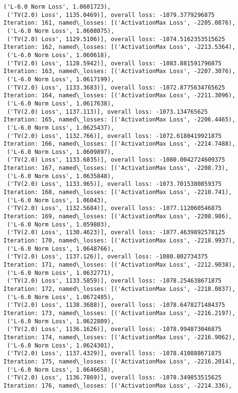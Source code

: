 \documentclass[10pt]{article}
\begin{document}
\begin{Verbatim}[commandchars=\\\{\}]
 ('L-6.0 Norm Loss', 1.0601723),
 ('TV(2.0) Loss', 1135.0469)], overall loss: -1079.3779296875
Iteration: 161, named\_losses: [('ActivationMax Loss', -2205.0876),
 ('L-6.0 Norm Loss', 1.0608075),
 ('TV(2.0) Loss', 1129.5106)], overall loss: -1074.5162353515625
Iteration: 162, named\_losses: [('ActivationMax Loss', -2213.5364),
 ('L-6.0 Norm Loss', 1.060618),
 ('TV(2.0) Loss', 1128.5942)], overall loss: -1083.881591796875
Iteration: 163, named\_losses: [('ActivationMax Loss', -2207.3076),
 ('L-6.0 Norm Loss', 1.0617199),
 ('TV(2.0) Loss', 1133.3683)], overall loss: -1072.8775634765625
Iteration: 164, named\_losses: [('ActivationMax Loss', -2211.3096),
 ('L-6.0 Norm Loss', 1.0617638),
 ('TV(2.0) Loss', 1137.113)], overall loss: -1073.134765625
Iteration: 165, named\_losses: [('ActivationMax Loss', -2206.4465),
 ('L-6.0 Norm Loss', 1.0625437),
 ('TV(2.0) Loss', 1132.766)], overall loss: -1072.6180419921875
Iteration: 166, named\_losses: [('ActivationMax Loss', -2214.7488),
 ('L-6.0 Norm Loss', 1.0609897),
 ('TV(2.0) Loss', 1133.6835)], overall loss: -1080.0042724609375
Iteration: 167, named\_losses: [('ActivationMax Loss', -2208.73),
 ('L-6.0 Norm Loss', 1.0635848),
 ('TV(2.0) Loss', 1133.965)], overall loss: -1073.7015380859375
Iteration: 168, named\_losses: [('ActivationMax Loss', -2210.741),
 ('L-6.0 Norm Loss', 1.06043),
 ('TV(2.0) Loss', 1132.5684)], overall loss: -1077.112060546875
Iteration: 169, named\_losses: [('ActivationMax Loss', -2208.986),
 ('L-6.0 Norm Loss', 1.059803),
 ('TV(2.0) Loss', 1130.4623)], overall loss: -1077.4639892578125
Iteration: 170, named\_losses: [('ActivationMax Loss', -2218.9937),
 ('L-6.0 Norm Loss', 1.0648766),
 ('TV(2.0) Loss', 1137.126)], overall loss: -1080.802734375
Iteration: 171, named\_losses: [('ActivationMax Loss', -2212.9038),
 ('L-6.0 Norm Loss', 1.0632771),
 ('TV(2.0) Loss', 1133.5859)], overall loss: -1078.254638671875
Iteration: 172, named\_losses: [('ActivationMax Loss', -2218.0837),
 ('L-6.0 Norm Loss', 1.0672485),
 ('TV(2.0) Loss', 1138.3688)], overall loss: -1078.6478271484375
Iteration: 173, named\_losses: [('ActivationMax Loss', -2216.2197),
 ('L-6.0 Norm Loss', 1.0622809),
 ('TV(2.0) Loss', 1136.1626)], overall loss: -1078.994873046875
Iteration: 174, named\_losses: [('ActivationMax Loss', -2216.9062),
 ('L-6.0 Norm Loss', 1.0624301),
 ('TV(2.0) Loss', 1137.4329)], overall loss: -1078.410888671875
Iteration: 175, named\_losses: [('ActivationMax Loss', -2216.2014),
 ('L-6.0 Norm Loss', 1.0646658),
 ('TV(2.0) Loss', 1136.7869)], overall loss: -1078.349853515625
Iteration: 176, named\_losses: [('ActivationMax Loss', -2214.336),

\end{Verbatim}
\end{document}
